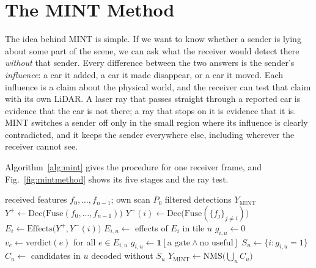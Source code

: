 \documentclass[conference]{IEEEtran}
\newcommand{\mint}{MINT}
\begin{document}
\section{The \mint{} Method}
\label{sec:method}
The idea behind \mint{} is simple. If we want to know whether a sender is lying about some part of the scene, we
can ask what the receiver would detect there \emph{without} that sender. Every difference between the two answers
is the sender's \emph{influence}: a car it added, a car it made disappear, or a car it moved. Each influence is a
claim about the physical world, and the receiver can test that claim with its own LiDAR. A laser ray that passes
straight through a reported car is evidence that the car is not there; a ray that stops on it is evidence that it
is. \mint{} switches a sender off only in the small region where its influence is clearly contradicted, and it
keeps the sender everywhere else, including wherever the receiver cannot see.

Algorithm~\ref{alg:mint} gives the procedure for one receiver frame, and Fig.~\ref{fig:mintmethod} shows its five
stages and the ray test.

\begin{algorithm}[!h]
\caption{\mint{} for one receiver frame}
\label{alg:mint}
\begin{algorithmic}[1]
\Require received features $f_0,\dots,f_{n-1}$; own scan $P_0$
\Ensure filtered detections $Y_{\mathrm{MINT}}$
\State $Y^{+}\gets\mathrm{Dec}\big(\mathrm{Fuse}(f_0,\dots,f_{n-1})\big)$ 
  \State $Y^{-}(i)\gets\mathrm{Dec}\big(\mathrm{Fuse}(\{f_j\}_{j\neq i})\big)$ 
  \State $E_i\gets\mathrm{Effects}\big(Y^{+},Y^{-}(i)\big)$ 
    \State $E_{i,u}\gets$ effects of $E_i$ in tile $u$
     
      \State $g_{i,u}\gets 0$ 
    \Else
      \State $v_e\gets\mathrm{verdict}(e)$ for all $e\in E_{i,u}$ 
      \State $g_{i,u}\gets\mathbf{1}[\text{a gate}\land\text{no useful}]$ 
    \EndIf
  \EndFor
\EndFor
{}
  \State $S_u\gets\{i: g_{i,u}=1\}$
  \State $C_u\gets$ candidates in $u$ decoded without $S_u$
\EndFor
\State \Return $Y_{\mathrm{MINT}}\gets\mathrm{NMS}\big(\bigcup_u C_u\big)$ 
\end{algorithmic}
\end{algorithm}
\end{document}
